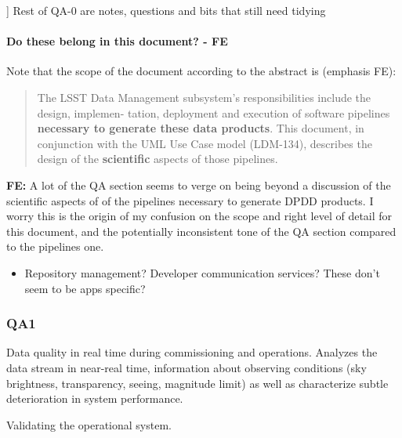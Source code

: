 \begin{note}]
Rest of QA-0 are notes, questions and bits that still need tidying
\end{note}

\paragraph{Do these belong in this document? - FE}

Note that the scope of the document according to the abstract is (emphasis FE):

\begin{quote}

  The LSST Data Management subsystem’s responsibilities include the
  design, implemen- tation, deployment and execution of software
  pipelines \textbf{necessary to generate these data products}. This
  document, in conjunction with the UML Use Case model (LDM-134),
  describes the design of the \textbf{scientific} aspects of those
  pipelines.
  
\end{quote}

\textbf{FE:}
A lot of the QA section seems to verge on being beyond a discussion of the scientific aspects of of the pipelines necessary to generate DPDD products. I worry this is the origin of my confusion on the scope and right level of detail for this document, and the potentially inconsistent tone of the QA section compared to the pipelines one. 

\begin{itemize}
\item Repository management? Developer communication services? These don't seem to be apps specific?
\end{itemize}

\subsubsection{QA1}
Data quality in real time during commissioning and operations. Analyzes the data stream in near-real time, information about observing conditions (sky brightness, transparency, seeing, magnitude limit) as well as characterize subtle deterioration in system performance.

Validating the operational system.

